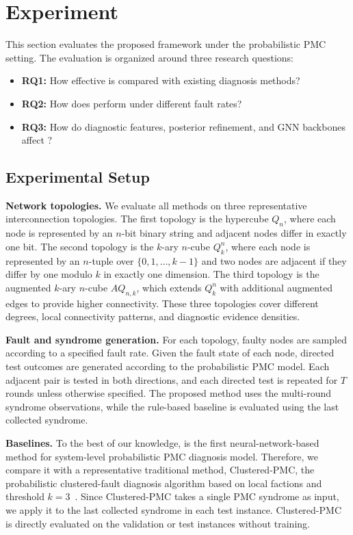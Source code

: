 \section{Experiment}
\label{sec:simulation}

This section evaluates the proposed \tool framework under the probabilistic PMC setting. The evaluation is organized around three research questions:
\begin{itemize}[leftmargin=*, itemsep=1pt, parsep=0pt, topsep=1pt]
    \item \textbf{RQ1:} How effective is \tool compared with existing diagnosis methods?
    \item \textbf{RQ2:} How does \tool perform under different fault rates?
    \item \textbf{RQ3:} How do diagnostic features, posterior refinement, and GNN backbones affect \tool?
\end{itemize}

\subsection{Experimental Setup}

\noindent \textbf{Network topologies.}
We evaluate all methods on three representative interconnection topologies. The first topology is the hypercube $Q_n$, where each node is represented by an $n$-bit binary string and adjacent nodes differ in exactly one bit. The second topology is the $k$-ary $n$-cube $Q_k^n$, where each node is represented by an $n$-tuple over $\{0,1,\ldots,k-1\}$ and two nodes are adjacent if they differ by one modulo $k$ in exactly one dimension. The third topology is the augmented $k$-ary $n$-cube $AQ_{n,k}$, which extends $Q_k^n$ with additional augmented edges to provide higher connectivity. These three topologies cover different degrees, local connectivity patterns, and diagnostic evidence densities.

\noindent \textbf{Fault and syndrome generation.}
For each topology, faulty nodes are sampled according to a specified fault rate. Given the fault state of each node, directed test outcomes are generated according to the probabilistic PMC model. Each adjacent pair is tested in both directions, and each directed test is repeated for $T$ rounds unless otherwise specified. The proposed method uses the multi-round syndrome observations, while the rule-based baseline is evaluated using the last collected syndrome.

\noindent \textbf{Baselines.}
To the best of our knowledge, \tool is the first neural-network-based method for system-level probabilistic PMC diagnosis model. Therefore, we compare it with a representative traditional method, Clustered-PMC, the probabilistic clustered-fault diagnosis algorithm based on local factions and threshold $k=3$~\cite{sun2023probabilistic}. Since Clustered-PMC takes a single PMC syndrome as input, we apply it to the last collected syndrome in each test instance. Clustered-PMC is directly evaluated on the validation or test instances without training.

